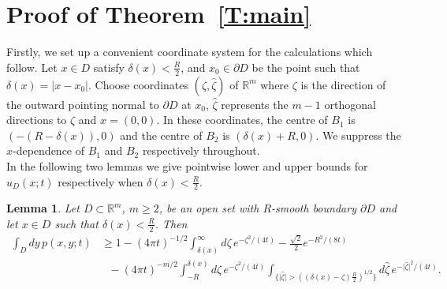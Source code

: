 \documentclass[a4paper,9pt]{amsart}
\newtheorem{lemma}[theorem]{Lemma}
\begin{document}
\section{Proof of Theorem~\ref{T:main}}\label{sec3}
Firstly, we set up a convenient coordinate system for the
calculations which follow. Let $x \in D$ satisfy $\delta(x)<
\frac{R}{2}$, and $x_{0} \in \partial D$ be the point such that
$\delta(x) = \vert x - x_{0} \vert$. Choose coordinates $(\zeta,
\hat{\zeta})$ of $\mathbb{R}^{m}$ where $\zeta$ is the direction
of the outward pointing normal to $\partial D$ at $x_{0}$,
$\hat{\zeta}$ represents the $m-1$ orthogonal directions to
$\zeta$ and $x=(0,0)$. In these coordinates, the centre of $B_{1}$
is $(-(R-\delta(x)),0)$ and the centre of $B_{2}$ is
$(\delta(x)+R,0)$. We suppress the $x$-dependence of $B_1$ and
$B_2$ respectively throughout.
\\[5pt]
\indent In the following two lemmas we give
pointwise lower and upper bounds for $u_{D}(x;t)$ respectively
when $\delta(x)<\frac{R}{2}.$
\begin{lemma}\label{L:lowersol}
Let $D \subset \mathbb{R}^{m}$, $m \geq 2$, be an open set with
$R$-smooth boundary $\partial D$ and let $x \in D$ such that
$\delta(x)<\frac{R}{2}$. Then
\begin{align*}
\int_{D}dy\, p(x,y;t) &\geq 1 -(4\pi t)^{-1/2}
\int_{\delta(x)}^{\infty}d\zeta \, e^{-\zeta^{2}/(4t)}
- \frac{\sqrt{2}}{2}e^{-R^2/(8t)}\\
&\ \ \ - (4\pi t)^{-m/2}\int_{-R} ^{\delta(x)}d\zeta \,
e^{-\zeta^2/(4t)}\int_{\{\vert \hat{\zeta} \vert >
\left((\delta(x)- \zeta)\frac{R}{2}\right)^{1/2}\}}d\hat{\zeta} \,
e^{-\vert \hat{\zeta} \vert^ 2/(4t)}.
\end{align*}
\end{lemma}
\end{document}
